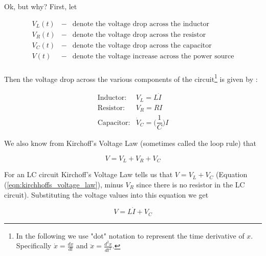 \documentclass{article}
\theoremstyle{definition}
\begin{document}
\bigskip
\noindent
Ok, but why? First, let

\begin{equation*}
 \begin{array}{llll}
V_{L}(t) &-& \text{denote the voltage drop across the inductor} \\
[4pt]
V_{R}(t) &-& \text{denote the voltage drop across the resistor} \\
[4pt]
V_{C}(t) &-& \text{denote the voltage drop across the capacitor} \\
[4pt]
V(t)     &-& \text{denote the voltage increase across the power source} \\
[3pt]																					%
\end{array}
\end{equation*}


\smallskip
\noindent
Then the voltage drop across the various components
of the circuit\footnote{In the following we use "dot"
notation to represent the time derivative of $x$. Specifically
$\dot{x} = \frac{dx}{dt}$ and $\ddot{x} = \frac{d^2 x}{dt^2}$.} 
is given by \cite{differential_equations_rlc_circuits}:

\medskip
\begin{equation*}
 \begin{array}{llll}
  \text{Inductor:}  & V_{L}       = L \dot{I} \\
[10pt]
  \text{Resistor:}  & V_{R}       = R I \\
[5pt]
  \text{Capacitor:} & \dot{V}_{C} = \bigg (\dfrac{1}{C} \bigg ) I 
 \end{array}
\end{equation*}

\medskip
\noindent
We also know from Kirchoff’s Voltage Law (sometimes called
the loop rule) \cite{wiki:kirchhoffs_circuit_laws}
that 

\smallskip
\begin{equation}
V = V_{L} + V_{R} + V_{C}
\label{eqn:kirchhoffs_voltage_law}
\end{equation}

\bigskip
\noindent
For an LC circuit Kirchoff’s Voltage Law tells us that
$V = V_{L} + V_{C}$ (Equation (\ref{eqn:kirchhoffs_voltage_law}),
minus $V_{R}$ since there is no resistor in the LC circuit). 
Substituting the voltage values into this equation 
we get 

\smallskip
\begin{equation*}
V = L \dot{I} + V_{C}
\end{equation*}
\end{document}
